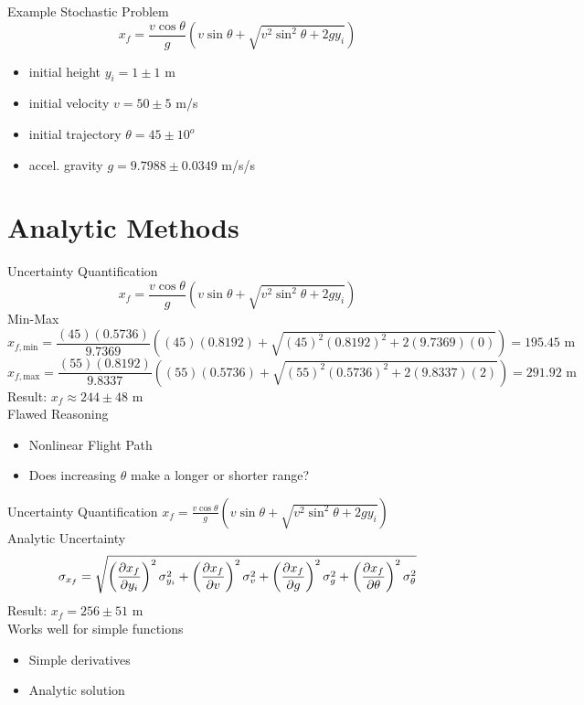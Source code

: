 \documentclass{beamer}
\begin{document}
\begin{frame}{Example Stochastic Problem}\vspace{-50pt}
\begin{equation}
x_f=\frac{v\cos{\theta}}{g}\left(v\sin\theta+\sqrt{v^2\sin^2\theta + 2gy_i}\right)
\end{equation}
\begin{itemize}
\item initial height $y_i = 1\pm1$ m
\item initial velocity $v = 50\pm5$ m/s
\item initial trajectory $\theta = 45\pm10^o$
\item accel. gravity $g = 9.7988 \pm0.0349$ m/s/s
\end{itemize}
\end{frame}

\section{Analytic Methods}
\begin{frame}{Uncertainty Quantification}\vspace{-20pt}
\[x_f=\frac{v\cos{\theta}}{g}\left(v\sin\theta+\sqrt{v^2\sin^2\theta + 2gy_i}\right)\]
Min-Max
\tiny
\[x_{f,\text{min}}=\frac{(45)(0.5736)}{9.7369}\left((45)(0.8192)+\sqrt{(45)^2(0.8192)^2+2(9.7369)(0)}\right)= 195.45 \text{ m}\]
\[x_{f,\text{max}}=\frac{(55)(0.8192)}{9.8337}\left((55)(0.5736)+\sqrt{(55)^2(0.5736)^2+2(9.8337)(2)}\right)= 291.92 \text{ m}\]
\normalsize
Result: $x_f\approx244\pm48$ m \vspace{15pt}\\ \pause
Flawed Reasoning
\begin{itemize}
\item Nonlinear Flight Path
\item Does increasing $\theta$ make a longer or shorter range?
\end{itemize}
\end{frame}

\begin{frame}{Uncertainty Quantification}\vspace{-30pt}
$x_f=\frac{v\cos{\theta}}{g}\left(v\sin\theta+\sqrt{v^2\sin^2\theta + 2gy_i}\right)$\\\vspace{10pt}
Analytic Uncertainty
\[\sigma_{x_f} = \sqrt{\left(\pdv{x_f}{y_i}\right)^2\sigma_{y_i}^2 + \left(\pdv{x_f}{v}\right)^2\sigma_{v}^2 + \left(\pdv{x_f}{g}\right)^2\sigma_{g}^2 + \left(\pdv{x_f}{\theta}\right)^2\sigma_{\theta}^2}\]%
Result: $x_f=256\pm51$ m  \vspace{10pt}\\
Works well for simple functions
\begin{itemize}
\item Simple derivatives
\item Analytic solution
\end{itemize}
\end{frame}
\end{document}
